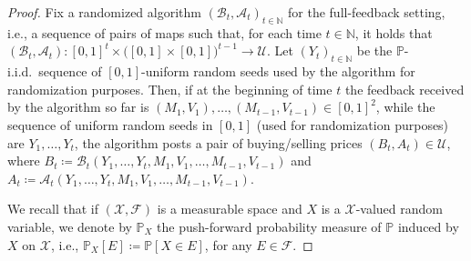 \documentclass[final,12pt]{colt2025}
\newcommand{\cA}{\mathcal{A}}
\newcommand{\cB}{\mathcal{B}}
\newcommand{\cF}{\mathcal{F}}
\newcommand{\cS}{\mathcal{S}}
\newcommand{\cU}{\mathcal{U}}
\newcommand{\cX}{\mathcal{X}}
\newcommand{\N}{\mathbb{N}}
\newcommand{\Pb}{\mathbb{P}}
\newcommand{\brb}[1]{\bigl(#1\bigr)}
\newcommand{\nP}{M}
\newcommand{\nZ}{V}
\newcommand{\nB}{B}
\newcommand{\ncB}{\cB}
\newcommand{\nS}{A}
\newcommand{\ncS}{\cS}
\begin{document}
{
\begin{proof}
\renewcommand{\cA}{\mathscr{A}}
\renewcommand{\cS}{\mathcal{A}}
Fix a randomized algorithm $(\ncB_t,\ncS_t)_{t \in \N}$ for the full-feedback setting, i.e., a sequence of pairs of maps such that, for each time $t \in \N$, it holds that $(\ncB_t, \ncS_t) \colon [0,1]^t\times \brb{[0,1] \times [0,1]}^{t-1} \to \cU$. Let $(Y_t)_{t \in \N}$ be the $\Pb$-i.i.d.\ sequence of $[0,1]$-uniform random seeds used by the algorithm for randomization purposes.
Then, if at the beginning of time $t$ the feedback received by the algorithm so far is $(\nP_1,\nZ_1),\dots,(\nP_{t-1},\nZ_{t-1}) \in [0,1]^2$, while the sequence of uniform random seeds in $[0,1]$ (used for randomization purposes) are $Y_1,\dots,Y_t$, the algorithm posts a pair of buying/selling prices $(\nB_t,\nS_t) \in \cU$, where $\nB_t \coloneqq \ncB_t(Y_1,\dots,Y_t,\nP_1,\nZ_1,\dots,\nP_{t-1},\nZ_{t-1})$ and $\nS_t \coloneqq \ncS_t(Y_1,\dots,Y_t,\nP_1,\nZ_1,\dots,\nP_{t-1}, \nZ_{t-1})$.

We recall that if $(\cX,\cF)$ is a measurable space and $X$ is a $\cX$-valued random variable, we denote by $\Pb_X$ the push-forward probability measure of $\Pb$ induced by $X$ on $\cX$, i.e., $\Pb_X [E] \coloneqq \Pb [X \in E] $, for any $E \in \cF$.


\end{proof}}
\end{document}
